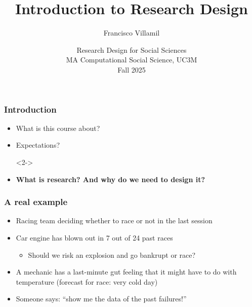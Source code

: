 \documentclass[aspectratio=43]{beamer}
\title[Lecture 1: Introduction to Research Design]{\Large Introduction to Research Design}
\author[]{Francisco Villamil}
\date[]{Research Design for Social Sciences\\MA Computational Social Science, UC3M\\Fall 2025}
\begin{document}

\begin{frame}

  \titlepage

\end{frame}

\begin{frame}
\frametitle{Introduction}
\centering

\begin{itemize}
  \item<1-> What is this course about?
  \item<1-> Expectations?
  \item[]<2->
  \item<2-> \textbf{What is research? And why do we need to design it?}
\end{itemize}

\end{frame}

\begin{frame}
\frametitle{A real example}
\centering

\begin{itemize}[<+->]
  \item Racing team deciding whether to race or not in the last session
  \item Car engine has blown out in 7 out of 24 past races
  \begin{itemize}
    \item Should we risk an explosion and go bankrupt or race?
  \end{itemize}
  \item A mechanic has a last-minute gut feeling that it might have to do with temperature (forecast for race: very cold day)
  \item Someone says: ``show me the data of the past failures!''
\end{itemize}

\end{frame}

\end{document}
